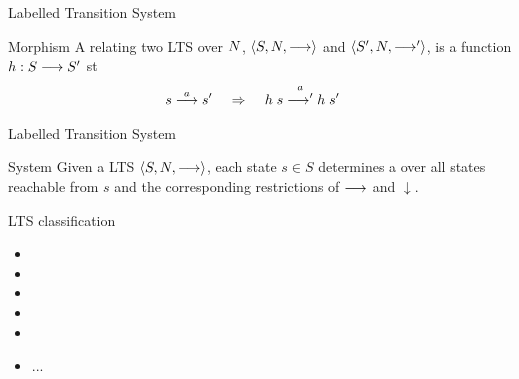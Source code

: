 \documentclass{beamer}
\begin{document}
\begin{slide}{Labelled Transition System}
\small
\begin{block}{Morphism}
A  relating two LTS over  $N$, $\mathopen{\langle}S,N, \longrightarrow\mathclose{\rangle}$ and $\mathopen{\langle}S',N,  \longrightarrow'\mathclose{\rangle}$,
is a function $h: S \longrightarrow S'$  st
\begin{align*}
s \stackrel{a}{\longrightarrow} s' \; \; \; \; \;  \mathbin{\Rightarrow} & \; \; \; \; \; h\; s  \stackrel{a}{\longrightarrow'} h\; s' 
\end{align*}
\end{block}

\begin{center}
\end{center}
\end{slide}

\begin{slide}{Labelled Transition System}
\small
\begin{block}{System}
Given a LTS $\mathopen{\langle}S, N, \longrightarrow\mathclose{\rangle}$, each state $s \in S$ determines a  over 
all states reachable from $s$ and the corresponding restrictions of $\longrightarrow$ and $\downarrow$.
\end{block}

\begin{block}{LTS classification}
\begin{itemize}
\item {}
\item {}
\item {}
\item {}
\item {}
\item ...
\end{itemize}
\end{block}

\end{slide}
\end{document}
